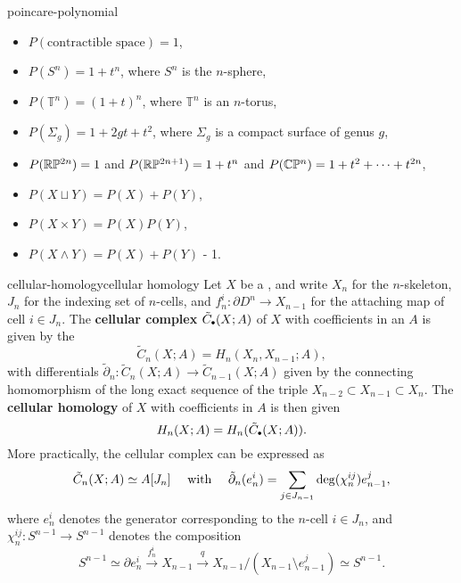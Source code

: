 \begin{example}{poincare-polynomial}
    \begin{itemize}
        \item $P(\text{contractible space}) = 1$,
        \item $P(S^n) = 1 + t^n$, where $S^n$ is the $n$-sphere,
        \item $P(\mathbb{T}^n) = (1 + t)^n$, where $\mathbb{T}^n$ is an $n$-torus,
        \item $P(\Sigma_g) = 1 + 2gt + t^2$, where $\Sigma_g$ is a compact surface of genus $g$,
        \item $P(\mathbb{R} \mathbb{P}^{2n}) = 1$ and $P(\mathbb{R} \mathbb{P}^{2n + 1}) = 1 + t^n$ and $P(\mathbb{C} \mathbb{P}^n) = 1 + t^2 + \cdots + t^{2n}$,
        \item $P(X \sqcup Y) = P(X) + P(Y)$,
        \item $P(X \times Y) = P(X) P(Y)$,
        \item $P(X \wedge Y) = P(X) + P(Y)$ - 1.
    \end{itemize}
\end{example}

\begin{topic}{cellular-homology}{cellular homology}
    Let $X$ be a , and write $X_n$ for the $n$-skeleton, $J_n$ for the indexing set of $n$-cells, and $f_n^i : \partial D^n \to X_{n - 1}$ for the attaching map of cell $i \in J_n$. The \textbf{cellular complex} $\tilde{C}_\bdot(X; A)$ of $X$ with coefficients in an  $A$ is given by the 
    \[ \tilde{C}_n(X; A) = H_n(X_n, X_{n - 1}; A) , \]
    with differentials $\tilde{\partial}_n : \tilde{C}_n(X; A) \to \tilde{C}_{n - 1}(X; A)$ given by the connecting homomorphism of the long exact sequence of the triple $X_{n - 2} \subset X_{n - 1} \subset X_n$. The \textbf{cellular homology} of $X$ with coefficients in $A$ is then given
    \[ H_n(X; A) = H_n(\tilde{C}_\bdot(X; A)) . \]
    More practically, the cellular complex can be expressed as
    \[ \tilde{C}_n(X; A) \simeq A[J_n] \quad \textup{ with } \quad \tilde{\partial}_n(e_n^i) = \sum_{j \in J_{n - 1}} \deg(\chi_n^{ij}) e_{n - 1}^j , \]
    where $e_n^i$ denotes the generator corresponding to the $n$-cell $i \in J_n$, and $\chi_n^{ij} : S^{n - 1} \to S^{n - 1}$ denotes the composition
    \[ S^{n - 1} \simeq \partial e_n^i \xrightarrow{f_n^i} X_{n - 1} \xrightarrow{q} X_{n - 1} / (X_{n - 1} \setminus e_{n - 1}^j) \simeq S^{n - 1} . \]
\end{topic}

